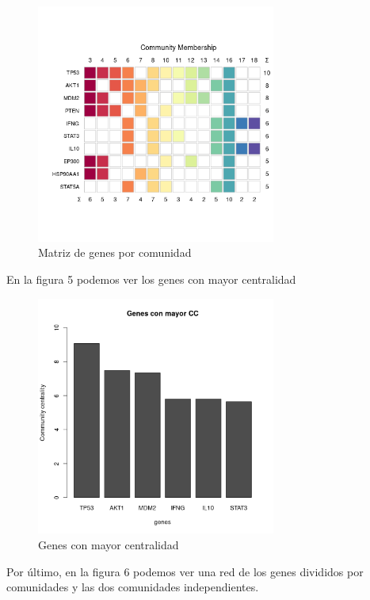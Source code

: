 \begin{figure}[h]
	\centering
	\includegraphics[width=0.70\textwidth]{figures/03_GenesMasCOnectadosOtrasComunidades.png}
	\caption{Matriz de genes por comunidad}
	\label{fig: Figura 4}
\end{figure}

En la figura 5 podemos ver los genes con mayor centralidad

\begin{figure}[h]
	\centering
	\includegraphics[width=0.70\textwidth]{figures/04_GenesMayorCentralidad.png}
	\caption{Genes con mayor centralidad}
	\label{fig: Figura 5}
\end{figure}

Por último, en la figura 6 podemos ver una red de los genes divididos por comunidades y las dos comunidades independientes.

